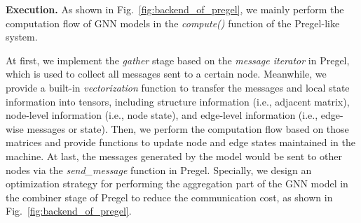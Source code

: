 \documentclass[conference]{IEEEtran}
\begin{document}
\textbf{Execution.} 
As shown in Fig.~\ref{fig:backend_of_pregel}, we mainly perform the computation flow of GNN models in the \emph{compute()} function of the Pregel-like system. 

At first, we implement the \emph{gather} stage based on the \emph{message iterator} in Pregel, which is used to collect all messages sent to a certain node.
Meanwhile, we provide a built-in \emph{vectorization} function to transfer the messages and local state information into tensors, including structure information (i.e., adjacent matrix), node-level information (i.e., node state), and edge-level information (i.e., edge-wise messages or state).
Then, we perform the computation flow based on those matrices and provide functions to update node and edge states maintained in the machine.
At last, the messages generated by the model would be sent to other nodes via the \emph{send\_message} function in Pregel.
Specially, we design an optimization strategy for performing the aggregation part of the GNN model in the combiner stage of Pregel to reduce the communication cost, as shown in Fig.~\ref{fig:backend_of_pregel}.


\end{document}
